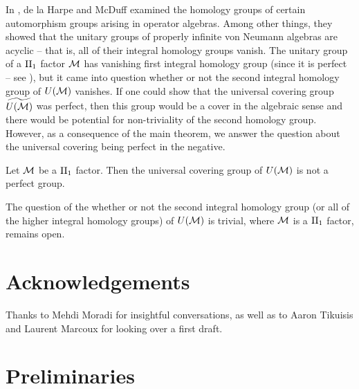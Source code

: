 \documentclass{amsart}
\begin{document}
In \cite{dlHarpeMcDuff83}, de la Harpe and McDuff examined the homology groups of certain automorphism groups arising in operator algebras. 
Among other things, they showed that the unitary groups of properly infinite von Neumann algebras are acyclic -- that is, all of their integral homology groups vanish.
The unitary group of a $\text{II}_1$ factor $\mathcal{M}$ has vanishing first integral homology group (since it is perfect -- see \cite{Broise67,FackdlHarpe80}), but it came into question whether or not the second integral homology group of $U(\mathcal{M})$ vanishes. 
If one could show that the universal covering group $\widetilde{U(\mathcal{M})}$ was perfect, then this group would be a cover in the algebraic sense \cite{Kervaire70} and there would be potential for non-triviality of the second homology group.
However, as a consequence of the main theorem, we answer the question about the universal covering being perfect in the negative. 

\begin{resultcor}
Let $\mathcal{M}$ be a $\text{II}_1$ factor. Then the universal covering group of $U(\mathcal{M})$ is not a perfect group.
\end{resultcor}
The question of the whether or not the second integral homology group (or all of the higher integral homology groups) of $U(\mathcal{M})$ is trivial, where $\mathcal{M}$ is a $\text{II}_1$ factor, remains open.


  \section*{Acknowledgements}
  Thanks to Mehdi Moradi for insightful conversations, as well as to Aaron Tikuisis and Laurent Marcoux for looking over a first draft.


\section{Preliminaries}\label{sec:prelim}
\end{document}
